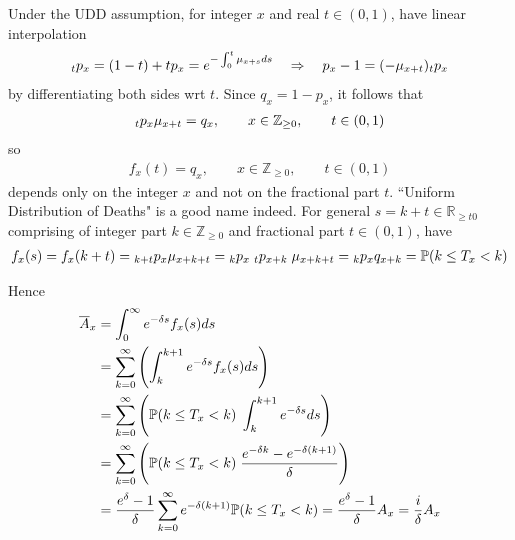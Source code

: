 \documentclass[hidelinks, 12pt]{article}
\theoremstyle{mydefstyle}
\theoremstyle{mythmstyle}
\begin{document}
Under the UDD assumption, for integer $x$ and real $t \in (0, 1)$, have linear interpolation
\begin{gather*}
\hspace{0mm}_tp_x = (1-t) + tp_x = e^{-\int_0^t \mu_{x+s} ds} \quad\Rightarrow\quad
p_x - 1 = (-\mu_{x+t}) \hspace{0mm}_tp_x
\end{gather*}
by differentiating both sides wrt $t$. Since $q_x = 1 - p_x$, it follows that
\begin{gather*}
\hspace{0mm}_tp_x \mu_{x+t} = q_x, \qquad x \in \mathbb{Z}_{\ge 0}, \qquad t \in (0, 1)
\end{gather*}
so
\begin{gather*}
f_x(t) = q_x, \qquad x \in \mathbb{Z}_{\ge 0}, \qquad t \in (0, 1)
\end{gather*}
depends only on the integer $x$ and not on the fractional part $t$. ``Uniform Distribution of Deaths" is a good name indeed. For general $s = k + t \in \mathbb{R}_{\ge t0}$ comprising of integer part $k \in \mathbb{Z}_{\ge 0}$ and fractional part $t \in (0, 1)$, have
\begin{gather*}
f_x(s) = f_x(k+t) = \hspace{0mm}_{k+t}p_x \mu_{x+k+t} = \hspace{0mm}_kp_x \hspace{1mm}_tp_{x+k} \hspace{1mm} \mu_{x+k+t}
= \hspace{0mm}_kp_x q_{x+k} = \mathbb{P}(k \le T_x < k)
\end{gather*}

Hence
\begin{align*}
\overline{A}_x
&= \int_0^{\infty} e^{-\delta s} f_x(s) ds \\
&= \sum_{k = 0}^{\infty} \left( \int_k^{k+1} e^{-\delta s} f_x(s) ds \right) \\
&= \sum_{k = 0}^{\infty} \left( \mathbb{P}(k \le T_x < k) \hspace{1mm} \int_k^{k+1} e^{-\delta s} ds \right) \\
&= \sum_{k = 0}^{\infty} \left( \mathbb{P}(k \le T_x < k) \hspace{1mm} \frac{e^{-\delta k} - e^{-\delta(k+1)}}{\delta} \right) \\
&= \frac{e^{\delta} - 1}{\delta} \sum_{k = 0}^{\infty} e^{-\delta (k+1)} \mathbb{P}(k \le T_x < k)
= \frac{e^{\delta} - 1}{\delta} A_x = \frac{i}{\delta} A_x
\end{align*}
\end{document}
